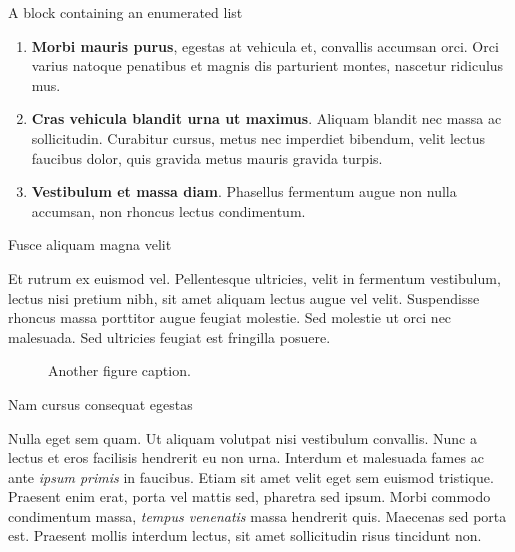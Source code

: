 \documentclass[final]{beamer}
\newlength{\colwidth}
\begin{document}
\begin{frame}[t]
\begin{columns}[t]
\begin{column}{\colwidth}
\begin{block}{A block containing an enumerated list}
        \begin{enumerate}
          \item \textbf{Morbi mauris purus}, egestas at vehicula et, convallis
                accumsan orci. Orci varius natoque penatibus et magnis dis parturient
                montes, nascetur ridiculus mus.
          \item \textbf{Cras vehicula blandit urna ut maximus}. Aliquam blandit nec
                massa ac sollicitudin. Curabitur cursus, metus nec imperdiet bibendum,
                velit lectus faucibus dolor, quis gravida metus mauris gravida turpis.
          \item \textbf{Vestibulum et massa diam}. Phasellus fermentum augue non
                nulla accumsan, non rhoncus lectus condimentum.
        \end{enumerate}
        
      \end{block}
      
      \begin{block}{Fusce aliquam magna velit}
        
        Et rutrum ex euismod vel. Pellentesque ultricies, velit in fermentum
        vestibulum, lectus nisi pretium nibh, sit amet aliquam lectus augue vel
        velit. Suspendisse rhoncus massa porttitor augue feugiat molestie. Sed
        molestie ut orci nec malesuada. Sed ultricies feugiat est fringilla
        posuere.
        
        \begin{figure}
          \centering
          \caption{Another figure caption.}
        \end{figure}
        
      \end{block}
      
      \begin{block}{Nam cursus consequat egestas}
        
        Nulla eget sem quam. Ut aliquam volutpat nisi vestibulum convallis. Nunc a
        lectus et eros facilisis hendrerit eu non urna. Interdum et malesuada fames
        ac ante \textit{ipsum primis} in faucibus. Etiam sit amet velit eget sem
        euismod tristique. Praesent enim erat, porta vel mattis sed, pharetra sed
        ipsum. Morbi commodo condimentum massa, \textit{tempus venenatis} massa
        hendrerit quis. Maecenas sed porta est. Praesent mollis interdum lectus,
        sit amet sollicitudin risus tincidunt non.
        

\end{block}
\end{column}
\end{columns}
\end{frame}
\end{document}
